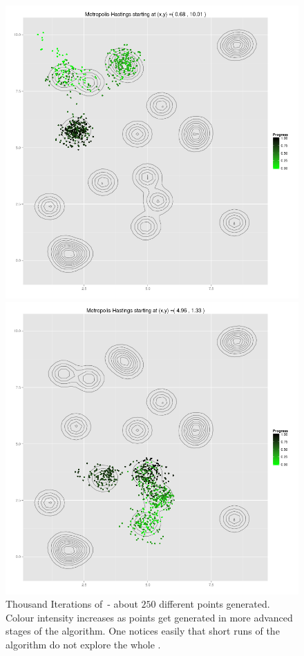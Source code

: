 \documentclass{book}
\begin{document}
\begin{figure}
	\begin{minipage}[b]{.5\linewidth}
		\centering \includegraphics[scale=.25]{./img/MH_simululation_1000_steps_ex1.png}
	\end{minipage}%
	\begin{minipage}[b]{.5\linewidth}
		\centering \includegraphics[scale=.25]{./img/MH_simululation_1000_steps_ex2.png}
	\end{minipage}
	\caption[Thousand Iterations of \MH]{Thousand Iterations of \MH\,- about $250$ different points generated. Colour intensity increases as points get generated in more advanced stages of the algorithm. One notices easily that short runs of the algorithm do not explore the whole \sspace.}\label{unexploredShort}
\end{figure}
\end{document}
